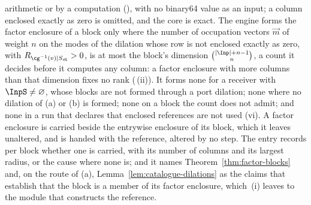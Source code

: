\begin{requirement}
\begin{enumerate}[label=(\roman*),leftmargin=2.4em]
  arithmetic or by a  computation
  (), with no binary64 value as an input; a column
  enclosed exactly as zero is omitted, and the core is exact. The engine forms
  the factor enclosure of a block only where the number of occupation vectors
  $\vec m$ of weight $n$ on the modes of the dilation whose row is not
  enclosed exactly as zero, with $R_{\cg^{-1}(v)|S_{\vec m}}>0$, is at most
  the block's dimension $\binom{|\Inp|+n-1}{n}$, a count it decides before it
  computes any column: a factor enclosure with more columns than that
  dimension fixes no rank
  (\,(ii)). It forms none
  for a receiver with $\InpS\neq\varnothing$, whose blocks are not formed
  through a port dilation; none where no dilation of (a) or (b) is formed; none on a block
  the count does not admit; and none in a run that declares that enclosed
  references are not used (vi). A factor enclosure is carried beside the
  entrywise enclosure of its block, which it leaves unaltered, and is handed
  with the reference, altered by no step. The entry records per block whether
  one is carried, with its number of columns and its largest radius, or the
  cause where none is; and it names Theorem~\ref{thm:factor-blocks} and, on
  the route of (a), Lemma~\ref{lem:catalogue-dilations} as the claims that
  establish that the block is a member of its factor enclosure, which
  \,(i) leaves to the module that
  constructs the reference.
\end{enumerate}
\end{requirement}
